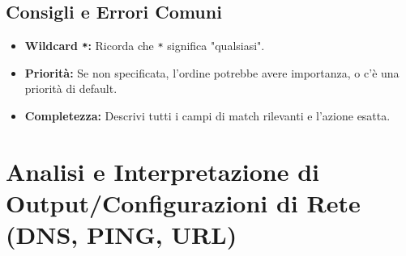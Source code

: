 \subsection{Consigli e Errori Comuni}
\begin{itemize}
    \item \textbf{Wildcard \texttt{*}:} Ricorda che \texttt{*} significa "qualsiasi".
    \item \textbf{Priorità:} Se non specificata, l'ordine potrebbe avere importanza, o c'è una priorità di default.
    \item \textbf{Completezza:} Descrivi tutti i campi di match rilevanti e l'azione esatta.
\end{itemize}

\section{Analisi e Interpretazione di Output/Configurazioni di Rete (DNS, PING, URL)}

